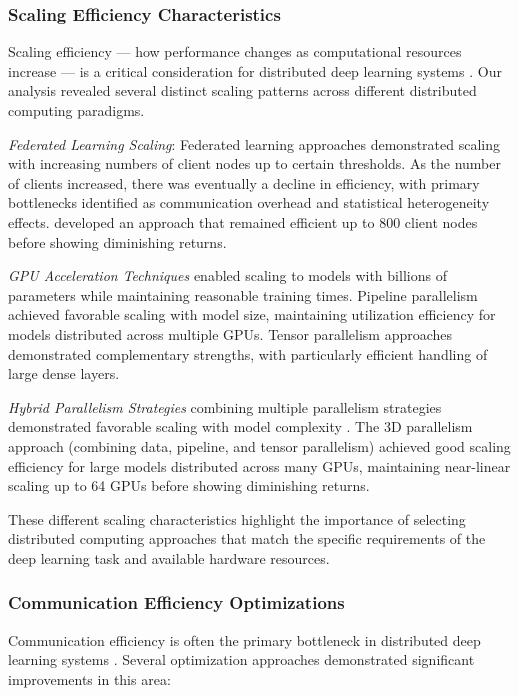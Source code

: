 \documentclass[acmsmall]{acmart}
\begin{document}
\subsubsection{Scaling Efficiency Characteristics}\label{subsubsec:distributed-computing-approaches-rq21:scaling-efficiency-characteristics}
Scaling efficiency --- how performance changes as computational resources increase --- is a critical consideration for distributed deep learning systems \citep{Zhang20229876}. Our analysis revealed several distinct scaling patterns across different distributed computing paradigms.

\textit{Federated Learning Scaling}: Federated learning approaches demonstrated scaling with increasing numbers of client nodes up to certain thresholds. As the number of clients increased, there was eventually a decline in efficiency, with primary bottlenecks identified as communication overhead and statistical heterogeneity effects. \citet{Zhang20229876} developed an approach that remained efficient up to 800 client nodes before showing diminishing returns.

\textit{GPU Acceleration Techniques} enabled scaling to models with billions of parameters while maintaining reasonable training times. Pipeline parallelism achieved favorable scaling with model size, maintaining utilization efficiency for models distributed across multiple GPUs. Tensor parallelism approaches demonstrated complementary strengths, with particularly efficient handling of large dense layers.

\textit{Hybrid Parallelism Strategies} combining multiple parallelism strategies demonstrated favorable scaling with model complexity \citep{Narayanan2021}. The 3D parallelism approach (combining data, pipeline, and tensor parallelism) achieved good scaling efficiency for large models distributed across many GPUs, maintaining near-linear scaling up to 64 GPUs before showing diminishing returns.

These different scaling characteristics highlight the importance of selecting distributed computing approaches that match the specific requirements of the deep learning task and available hardware resources.

\subsubsection{Communication Efficiency Optimizations}\label{subsubsec:distributed-computing-approaches-rq21:communication-efficiency-optimizations}
Communication efficiency is often the primary bottleneck in distributed deep learning systems \citep{Alistarh2017}. Several optimization approaches demonstrated significant improvements in this area:
\end{document}
